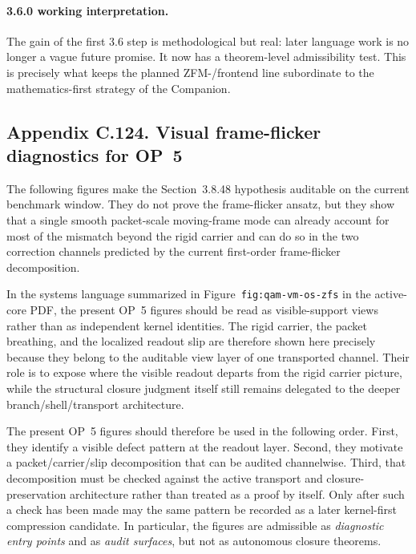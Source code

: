 \paragraph{3.6.0 working interpretation.}
The gain of the first 3.6 step is methodological but real: later language work is no longer a vague future promise. It now has a theorem-level admissibility test. This is precisely what keeps the planned ZFM-/frontend line subordinate to the mathematics-first strategy of the Companion.


\clearpage
\subsection*{Appendix C.124. Visual frame-flicker diagnostics for OP~5}
The following figures make the Section~3.8.48 hypothesis auditable on the current benchmark window. They do not prove the frame-flicker ansatz, but they show that a single smooth packet-scale moving-frame mode can already account for most of the mismatch beyond the rigid carrier and can do so in the two correction channels predicted by the current first-order frame-flicker decomposition.

\begin{remark}\label{rem:appendixC-op5-systems-reading}
In the systems language summarized in Figure~\texttt{fig:qam-vm-os-zfs} in the active-core PDF, the present OP~5 figures should be read as visible-support views rather than as independent kernel identities. The rigid carrier, the packet breathing, and the localized readout slip are therefore shown here precisely because they belong to the auditable view layer of one transported channel. Their role is to expose where the visible readout departs from the rigid carrier picture, while the structural closure judgment itself still remains delegated to the deeper branch/shell/transport architecture.
\end{remark}


\begin{remark}\label{rem:appendixC-op5-visual-workflow}
The present OP~5 figures should therefore be used in the following order. First, they identify a visible defect pattern at the readout layer. Second, they motivate a packet/carrier/slip decomposition that can be audited channelwise. Third, that decomposition must be checked against the active transport and closure-preservation architecture rather than treated as a proof by itself. Only after such a check has been made may the same pattern be recorded as a later kernel-first compression candidate. In particular, the figures are admissible as \emph{diagnostic entry points} and as \emph{audit surfaces}, but not as autonomous closure theorems.
\end{remark}


